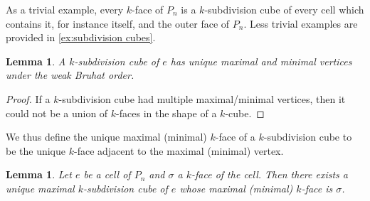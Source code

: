 \documentclass{amsart}
\newtheorem{lemma}[theorem]{Lemma}
\theoremstyle{definition}
\begin{document}
As a trivial example, every $k$-face of $P_n$ is a $k$-subdivision cube of every cell which contains it, for instance itself, and the outer face of $P_n$.
Less trivial examples are provided in \cref{ex:subdivision cubes}.

\begin{lemma}\label{lem:k-subdiv cubes have max/min k faces}
A $k$-subdivision cube of $e$ has unique maximal and minimal vertices under the weak Bruhat order.
\end{lemma}

\begin{proof}
If a $k$-subdivision cube had multiple maximal/minimal vertices, then it could not be a union of $k$-faces in the shape of a $k$-cube.
\end{proof}

We thus define the unique maximal (minimal) $k$-face of a $k$-subdivision cube to be the unique $k$-face adjacent to the maximal (minimal) vertex.

\begin{lemma}\label{lem:Unique maximal subdivcubes}
Let $e$ be a cell of $P_n$ and $\sigma$ a $k$-face of the cell. Then there exists a unique maximal $k$-subdivision cube of $e$ whose maximal (minimal) $k$-face is $\sigma$.
\end{lemma}
\end{document}
